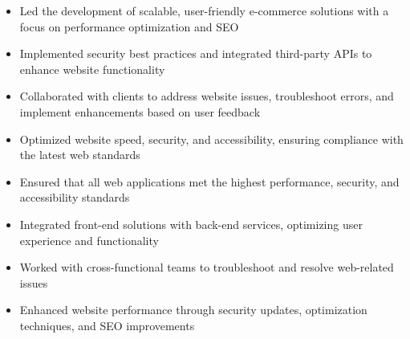 \par\smallskip
\begin{minipage}{13.75cm}
  \begin{minipage}{6.5cm}
    \begin{itemize}
      \item Led the development of scalable, user-friendly e-commerce solutions with a focus on performance optimization and SEO
      \item Implemented security best practices and integrated third-party APIs to enhance website functionality
    \end{itemize}
  \end{minipage}
  \hfill
  \begin{minipage}{6.5cm}
    \begin{itemize}
      \item Collaborated with clients to address website issues, troubleshoot errors, and implement enhancements based on user feedback
      \item Optimized website speed, security, and accessibility, ensuring compliance with the latest web standards
    \end{itemize}
  \end{minipage}
\end{minipage}
\par\smallskip
\divider

\par\smallskip
\begin{minipage}{13.75cm}
  \begin{minipage}{6.5cm}
    \begin{itemize}
      \item Ensured that all web applications met the highest performance, security, and accessibility standards
      \item Integrated front-end solutions with back-end services, optimizing user experience and functionality
    \end{itemize}
  \end{minipage}
  \hfill
  \begin{minipage}{6.5cm}
    \begin{itemize}
      \item Worked with cross-functional teams to troubleshoot and resolve web-related issues
      \item Enhanced website performance through security updates, optimization techniques, and SEO improvements
    \end{itemize}
  \end{minipage}
\end{minipage}

